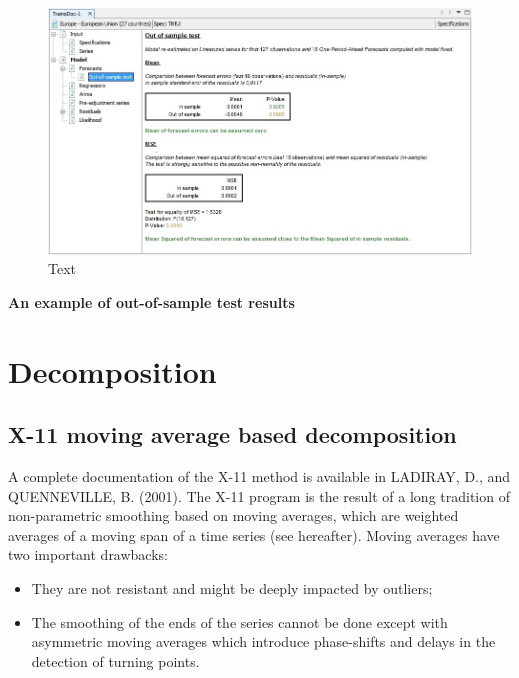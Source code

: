 \documentclass[
  letterpaper,
  DIV=11,
  numbers=noendperiod]{scrreprt}
\begin{document}
\begin{figure}

{\centering \includegraphics{./All_images/image45_RMSB.jpg}

}

\caption{Text}

\end{figure}

\textbf{An example of out-of-sample test results}

\hypertarget{decomposition}{%
\section{Decomposition}\label{decomposition}}

\hypertarget{x-11-moving-average-based-decomposition}{%
\subsection{X-11 moving average based
decomposition}\label{x-11-moving-average-based-decomposition}}

A complete documentation of the X-11 method is available in LADIRAY, D.,
and QUENNEVILLE, B. (2001). The X-11 program is the result of a long
tradition of non-parametric smoothing based on moving averages, which
are weighted averages of a moving span of a time series (see hereafter).
Moving averages have two important drawbacks:

\begin{itemize}
\item
  They are not resistant and might be deeply impacted by outliers;
\item
  The smoothing of the ends of the series cannot be done except with
  asymmetric moving averages which introduce phase-shifts and delays in
  the detection of turning points.
\end{itemize}
\end{document}
